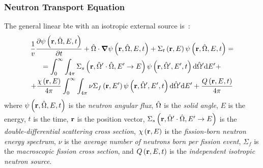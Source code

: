 \begin{frame}
        \frametitle{Neutron Transport Equation}
        The general linear \gls{bte} with an isotropic external source is~\cite{Larsen2010}:
        \begin{multline}\label{eq:general-bte}
                \frac{1}{v}\pdv{\psi\left(\mathbf{r},\hat{\Omega},E,t\right)}{t} + \hat{\Omega}\cdot \grad \psi\left(\mathbf{r},\hat{\Omega},E,t\right)+\Sigma_t\left(\mathbf{r},E\right)\psi\left(\mathbf{r},\hat{\Omega},E,t\right)=\\= \int_{0}^{\infty}\int_{4\pi}\Sigma_s \left(\mathbf{r},\hat{\Omega}'\cdot \hat{\Omega},E'\rightarrow E\right)\psi\left(\mathbf{r},\hat{\Omega}',E',t\right)\dd \hat{\Omega}' \dd E' +\\+ \frac{\chi \left(\mathbf{r},E\right)}{4\pi }\int_{0}^\infty \int_{4\pi}\nu \Sigma_f \left(\mathbf{r},E'\right)\psi\left(\mathbf{r},\hat{\Omega}',E',t\right) \dd \hat{\Omega} ' \dd E' +\frac{Q\left(\mathbf{r},E,t\right)}{4\pi}
        \end{multline}
        where $\psi\left(\mathbf{r},\hat{\Omega},E,t\right)$ is the \textit{neutron angular flux}, $\hat{\Omega}$ is the \textit{solid angle}, $E$ is the energy, $t$ is the time, $\mathbf{r}$ is the position vector, $\Sigma_s \left(\mathbf{r},\hat{\Omega}'\cdot \hat{\Omega},E'\rightarrow E\right)$ is the \textit{double-differential scattering cross section}, $\chi \left(\mathbf{r},E\right)$ is the \textit{fission-born neutron energy spectrum}, $\nu$ is the \textit{average number of neutrons born per fission event}, $\Sigma_f$ is the \textit{macroscopic fission cross section}, and $Q\left(\mathbf{r},E,t\right)$ is the \textit{independent isotropic neutron source}.
\end{frame}

